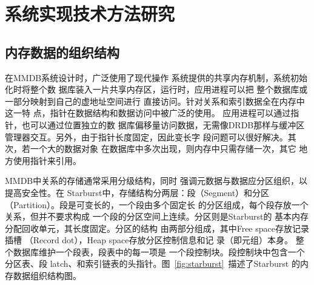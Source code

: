 \documentclass[literaturereview]{zjutreport}
\begin{document}
\begin{table}[htbp]
\caption{主流内存数据库}\label{tab:table2}
\vspace{\baselineskip}
\end{table}

\chapter{系统实现技术方法研究}
\section{内存数据的组织结构}
在MMDB系统设计时，广泛使用了现代操作
系统提供的共享内存机制，系统初始化时将整个数
据库装入一片共享内存区，运行时，应用进程可以把
整个数据库或一部分映射到自己的虚地址空间进行
直接访问。针对关系和索引数据全在内存中这一特
点，指针在数据结构和数据访问中被广泛的使用。
应用进程可以通过指针，也可以通过位置独立的数
据库偏移量访问数据，无需像DRDB那样与缓冲区
管理器交互。另外，由于指针长度固定，因此变长字
段问题可以很好解决。其次，若一个大的数据对象
在数据库中多次出现，则内存中只需存储一次，其它
地方使用指针来引用。

MMDB中关系的存储通常采用分级结构，同时
强调元数据与数据应分区组织，以提高安全性。在
Starburst中，存储结构分两层：段（Segment）和分区
（Partition）。段是可变长的，一个段由多个固定长
的分区组成，每个段存放一个关系，但并不要求构成
一个段的分区空间上连续。分区则是Starburst的
基本内存分配回收单元，其长度固定。分区的结构
由两部分组成，其中Free space存放记录插槽
（Record dot），Heap space存放分区控制信息和记
录（即元组）本身。
整个数据库维护一个段表，段表中的每一项是
一个段控制块。段控制块中包含一个分区表、段
latch、和索引链表的头指针。图~\ref{fig:starburst}~描述了Starburst
的内存数据组织结构图。
\end{document}
